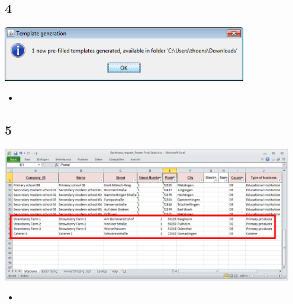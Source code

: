 \documentclass{beamer}
\begin{document}
\subsection{4}
\begin{frame}
	\begin{center}
  		\includegraphics[width=0.8\textwidth]{4.png}
	\end{center}
	\begin{itemize}
		\item
	\end{itemize}
\end{frame}

\subsection{5}
\begin{frame}
	\begin{center}
  		\includegraphics[width=0.95\textwidth]{5.png}
	\end{center}
	\begin{itemize}
		\item
	\end{itemize}
\end{frame}
\end{document}
